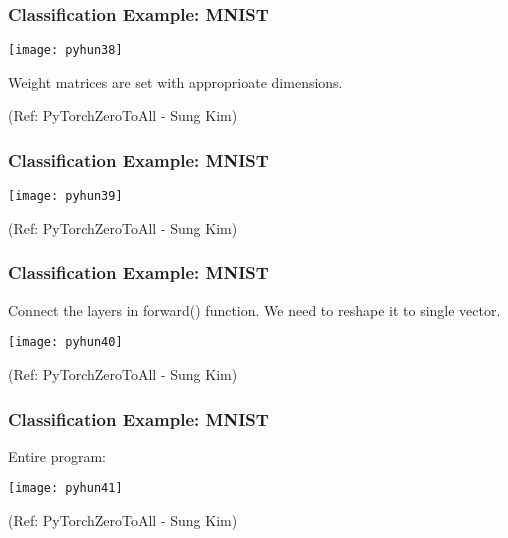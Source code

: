 \begin{frame}[fragile] \frametitle{Classification Example: MNIST}
\begin{center}
\texttt{[image: pyhun38]}
\end{center}

Weight matrices are set with approprioate dimensions.

\tiny{(Ref: PyTorchZeroToAll  - Sung Kim)}
\end{frame}

\begin{frame}[fragile] \frametitle{Classification Example: MNIST}
\begin{center}
\texttt{[image: pyhun39]}
\end{center}

\tiny{(Ref: PyTorchZeroToAll  - Sung Kim)}
\end{frame}

\begin{frame}[fragile] \frametitle{Classification Example: MNIST}

Connect the layers in forward() function. We need to reshape it to single vector.

\begin{center}
\texttt{[image: pyhun40]}
\end{center}

\tiny{(Ref: PyTorchZeroToAll  - Sung Kim)}
\end{frame}


\begin{frame}[fragile] \frametitle{Classification Example: MNIST}

Entire program:

\begin{center}
\texttt{[image: pyhun41]}
\end{center}


\tiny{(Ref: PyTorchZeroToAll  - Sung Kim)}
\end{frame}





